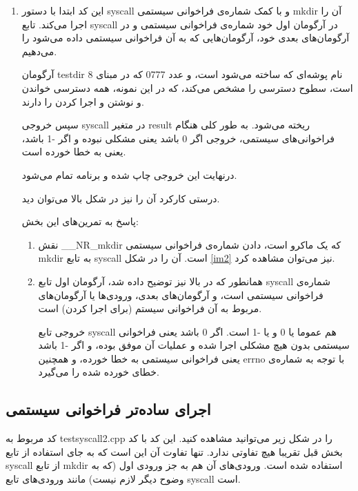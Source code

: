 \documentclass[12pt]{article}
\begin{document}
\begin{enumerate}
        \item این کد ابتدا با دستور 
        syscall
        و با کمک شماره‌ی فراخوانی سیستمی 
        mkdir
        آن را اجرا می‌کند.
        تابع
        syscall 
        در آرگومان اول خود شماره‌ی فراخوانی سیستمی و در آرگومان‌های بعدی خود، آرگومان‌هایی که به آن فراخوانی سیستمی داده می‌شود را می‌دهیم.

        آرگومان 
        testdir
        نام پوشه‌ای که ساخته می‌شود است، و عدد
        0777
        که در مبنای 8 است، سطوح دسترسی را مشخص می‌کند، که در این نمونه، همه دسترسی خواندن و نوشتن و اجرا کردن را دارند.

        سپس خروجی 
        syscall
        در متغیر 
        result
        ریخته می‌شود. به طور کلی هنگام فراخوانی‌های سیستمی، خروجی اگر 0 باشد یعنی مشکلی نبوده و اگر 
        \textenglish{-1}
        باشد، یعنی به خطا خورده است.

        درنهایت این خروجی چاپ شده و برنامه تمام می‌شود.

        درستی کارکرد آن را نیز در شکل بالا می‌توان دید.

        پاسخ به تمرین‌های این بخش:

        \begin{enumerate}
            \item نقش 
            \textenglish{\_\_NR\_mkdir}
            که یک ماکرو است، دادن شماره‌ی فراخوانی سیستمی
            mkdir
            به تابع
            syscall
            است. آن را در شکل
            \ref{im2}
            نیز می‌توان مشاهده کرد.

            \item همانطور که در بالا نیز توضیح داده شد، آرگومان اول تابع
            syscall
            شماره‌ی فراخوانی سیستمی است، و آرگومان‌های بعدی، ورودی‌ها یا آرگومان‌های مربوط به آن فراخوانی سیستم (برای اجرا کردن) است.

            خروجی تابع
            syscall
            هم عموما یا \textenglish{0} و یا 
            \textenglish{-1}
            است.
            اگر \textenglish{0} باشد یعنی فراخوانی سیستمی بدون هیچ مشکلی اجرا شده و عملیات آن موفق بوده، و اگر
            \textenglish{-1}
            باشد یعنی فراخوانی سیستمی به خطا خورده، و همچنین
            \textenglish{errno}
            با توجه به شماره‌ی خطای خورده شده را می‌گیرد.
        \end{enumerate}
        
        \end{enumerate}

        \subsection{اجرای ساده‌تر فراخوانی سیستمی}
        کد مربوط به
        \textenglish{testsyscall2.cpp}
        را در شکل زیر می‌توانید مشاهده کنید.
        این کد با کد بخش قبل تقریبا هیچ تفاوتی ندارد. تنها تفاوت آن این است که به جای استفاده از تابع
        \textenglish{syscall}
        از تابع
        \textenglish{mkdir}
        استفاده شده است. ورودی‌های آن هم به جز ورودی اول (که به وضوح دیگر لازم نیست) مانند ورودی‌های تابع
        \textenglish{syscall}
        است.
\end{document}
